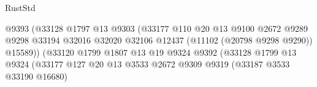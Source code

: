 \begin{lexlean}{RustStd}
\begin{coremodule}
                                                        @9393
                                                        (@33128
                                                          @1797
                                                          @13
                                                          @9303
                                                          (@33177
                                                            @110
                                                            @20
                                                            @13
                                                            @9100
                                                            @2672
                                                            @9289
                                                            @9298
                                                            @33194
                                                            @32016
                                                            @32020
                                                            @32106
                                                            @12437
                                                            (@11102 (@20798 @9298 @9290))
                                                            @15589))
                                                        (@33120
                                                          @1799
                                                          @1807
                                                          @13
                                                          @19
                                                          @9324
                                                          @9392
                                                          (@33128
                                                            @1799
                                                            @13
                                                            @9324
                                                            (@33177
                                                              @127
                                                              @20
                                                              @13
                                                              @3533
                                                              @2672
                                                              @9309
                                                              @9319
                                                              (@33187 @3533 @33190 @16680)

\end{coremodule}
\end{lexlean}
